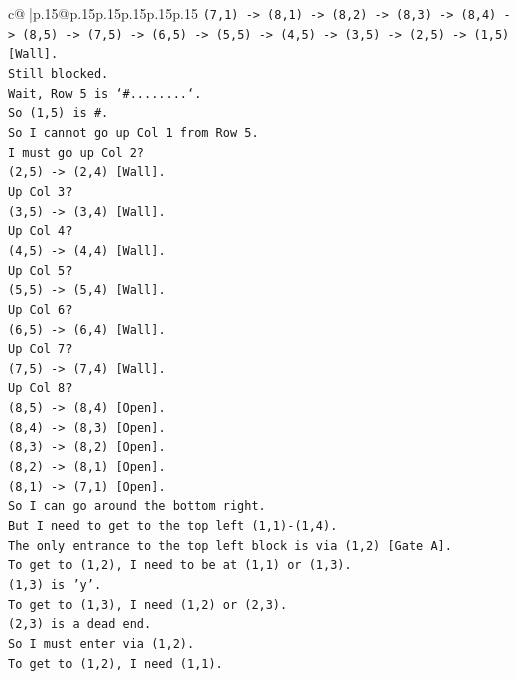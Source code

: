 \documentclass{article}
\begin{document}
{\begin{supertabular}{c@{$\;$}|p{.15\linewidth}@{}p{.15\linewidth}p{.15\linewidth}p{.15\linewidth}p{.15\linewidth}p{.15\linewidth}}
{{{\texttt{(7,1) {-}> (8,1) {-}> (8,2) {-}> (8,3) {-}> (8,4) {-}> (8,5) {-}> (7,5) {-}> (6,5) {-}> (5,5) {-}> (4,5) {-}> (3,5) {-}> (2,5) {-}> (1,5) {[}Wall{]}.} \\
\texttt{Still blocked.} \\
\texttt{Wait, Row 5 is `\#........`.} \\
\texttt{So (1,5) is \#.} \\
\texttt{So I cannot go up Col 1 from Row 5.} \\
\texttt{I must go up Col 2?} \\
\texttt{(2,5) {-}> (2,4) {[}Wall{]}.} \\
\texttt{Up Col 3?} \\
\texttt{(3,5) {-}> (3,4) {[}Wall{]}.} \\
\texttt{Up Col 4?} \\
\texttt{(4,5) {-}> (4,4) {[}Wall{]}.} \\
\texttt{Up Col 5?} \\
\texttt{(5,5) {-}> (5,4) {[}Wall{]}.} \\
\texttt{Up Col 6?} \\
\texttt{(6,5) {-}> (6,4) {[}Wall{]}.} \\
\texttt{Up Col 7?} \\
\texttt{(7,5) {-}> (7,4) {[}Wall{]}.} \\
\texttt{Up Col 8?} \\
\texttt{(8,5) {-}> (8,4) {[}Open{]}.} \\
\texttt{(8,4) {-}> (8,3) {[}Open{]}.} \\
\texttt{(8,3) {-}> (8,2) {[}Open{]}.} \\
\texttt{(8,2) {-}> (8,1) {[}Open{]}.} \\
\texttt{(8,1) {-}> (7,1) {[}Open{]}.} \\
\texttt{So I can go around the bottom right.} \\
\texttt{But I need to get to the top left (1,1){-}(1,4).} \\
\texttt{The only entrance to the top left block is via (1,2) {[}Gate A{]}.} \\
\texttt{To get to (1,2), I need to be at (1,1) or (1,3).} \\
\texttt{(1,3) is 'y'.} \\
\texttt{To get to (1,3), I need (1,2) or (2,3).} \\
\texttt{(2,3) is a dead end.} \\
\texttt{So I must enter via (1,2).} \\
\texttt{To get to (1,2), I need (1,1).} \\
}}}
\end{supertabular}}
\end{document}
